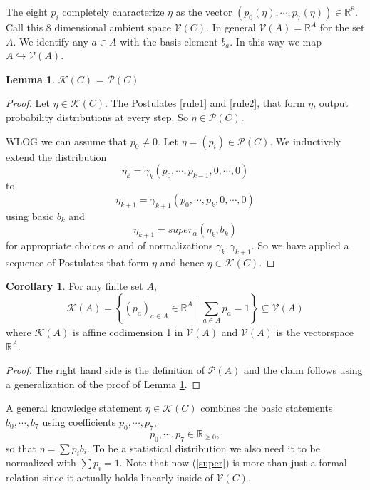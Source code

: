 \documentclass[12pt,a4paper]{article}
\theoremstyle{myrule}
\theoremstyle{postulate}
\theoremstyle{definition}
\newtheorem{corollary}{Corollary}[theorem]
\newtheorem{lemma}[theorem]{Lemma}
\begin{document}
The eight $p_i$ completely characterize $\eta$ as the vector $(p_\mathit{0}(\eta),\cdots,p_\mathit{7}(\eta)) \in \mathbb{R}^8$.  Call this 8 dimensional ambient space $\mathcal{V}(C)$. In general $\mathcal{V}(A) = \mathbb{R}^A$ for the set $A$.  We identify any $a \in A$ with the basis element $b_a$.  In this way we map $A \hookrightarrow \mathcal{V}(A)$.
\begin{lemma}
\label{prob}
  $\mathcal{K}(C)$ = $\mathcal{P}(C)$
\end{lemma}
\begin{proof}
  Let $\eta \in \mathcal{K}(C)$.  The Postulates \ref{rule1} and \ref{rule2}, that form $\eta$, output probability distributions at every step.  So $\eta \in \mathcal{P}(C)$.
  
  WLOG we can assume that $p_0 \not = 0$.  Let $\eta = (p_i) \in \mathcal{P}(C)$.  We inductively extend the distribution
  \[
  \eta_k = \gamma_k (p_0, \cdots, p_{k-1}, 0, \cdots, 0)
  \]
  to
  \[
  \eta_{k+1} = \gamma_{k+1} (p_0, \cdots, p_{k}, 0, \cdots, 0)
  \]
  using basic $b_k$ and 
  \[
  \eta_{k+1} = super_\alpha(\eta_k,b_k)
  \]
  for appropriate choices $\alpha$ and of normalizations $\gamma_k, \gamma_{k+1}$. So we have applied a sequence of Postulates that form $\eta$ and hence $\eta \in \mathcal{K}(C)$.
\end{proof}

\begin{corollary}
  For any finite set $A$,
  \[
  \mathcal{K}(A) = \left\{ (p_a)_{a \in A} \in \mathbb{R}^{A} \middle | \sum_{a \in A} p_a = 1 \right\}  \subseteq \mathcal{V}(A)
  \]
where $\mathcal{K}(A)$ is affine codimension 1 in $\mathcal{V}(A)$ and $\mathcal{V}(A)$ is the vectorspace $\mathbb{R}^A$.
\end{corollary}
\begin{proof}
  The right hand side is the definition of $\mathcal{P}(A)$ and the claim follows using a generalization of the proof of Lemma \ref{prob}.
\end{proof}

A general knowledge statement $\eta \in \mathcal{K}(C)$ combines the basic statements $b_\mathit{0}, \cdots, b_\mathit{7}$ using coefficients $p_\mathit{0}, \cdots, p_\mathit{7}$,
\begin{equation}
\label{peq}
  p_\mathit{0},\cdots,p_{\mathit{7}} \in \mathbb{R}_{\ge 0},
\end{equation}
so that $\eta = \sum p_i b_i$.  To be a statistical distribution we also need it to be normalized with $\sum p_i = 1$.  Note that now (\ref{super}) is more than just a formal relation since it actually holds linearly inside of $\mathcal{V}(C)$.
\end{document}
